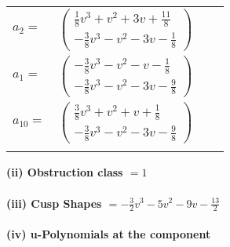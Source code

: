 \documentclass[1p]{elsarticle_modified}
\theoremstyle{definition}
\begin{document}
\begin{tabular}{m{7pt} m{180pt} m{7pt} m{180pt} }
\flushright $a_{2}=$&$\begin{pmatrix}\frac{1}{8} v^3+v^2+3 v+\frac{11}{8}\\-\frac{3}{8} v^3- v^2-3 v-\frac{1}{8}\end{pmatrix}$ \\
\flushright $a_{1}=$&$\begin{pmatrix}-\frac{3}{8} v^3- v^2- v-\frac{1}{8}\\-\frac{3}{8} v^3- v^2-3 v-\frac{9}{8}\end{pmatrix}$ \\
\flushright $a_{10}=$&$\begin{pmatrix}\frac{3}{8} v^3+v^2+v+\frac{1}{8}\\-\frac{3}{8} v^3- v^2-3 v-\frac{9}{8}\end{pmatrix}$\\&\end{tabular}
\flushleft \textbf{(ii) Obstruction class $= 1$}\\~\\
\flushleft \textbf{(iii) Cusp Shapes $= -\frac{3}{2} v^3-5 v^2-9 v-\frac{13}{2}$}\\~\\
\newpage\renewcommand{\arraystretch}{1}
\flushleft \textbf{(iv) u-Polynomials at the component}\newline \\
\end{document}
